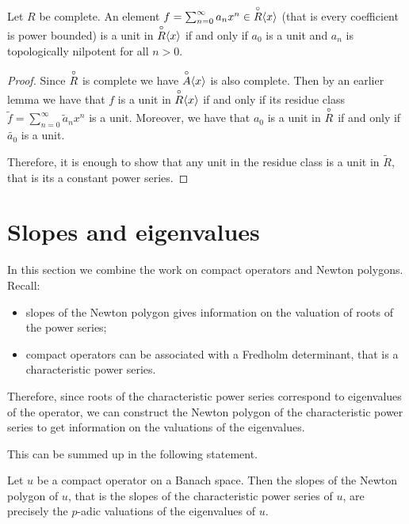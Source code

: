 \begin{lemma}
  Let $R$ be complete. An element $f = \sum_{n = 0}^\infty a_n x^n \in \overset{\circ}{R} \langle x \rangle$ (that
  is every coefficient is power bounded) is a unit in $\overset{\circ}{R} \langle x \rangle$ if and only if $a_0$
  is a unit and $a_n$ is topologically nilpotent for all $n > 0$.
\end{lemma}

\begin{proof}
  Since $\overset{\circ}{R}$ is complete we have $\overset{\circ}{A} \langle x \rangle$ is also complete. Then by an earlier
  lemma we have that $f$ is a unit in $\overset{\circ}{R} \langle x \rangle$ if and only if its residue class
  $ \tilde{f} = \sum_{n=0}^\infty \tilde{a}_n x^n$ is a unit.
  Moreover, we have that $a_0$ is a unit in $\overset{\circ}{R}$ if and only if $\tilde{a_0}$ is a unit.

  Therefore, it is enough to show that any unit in the residue class is a unit in $\tilde{R}$, that
  is its a constant power series.
\end{proof}


\chapter{Slopes and eigenvalues}

In this section we combine the work on compact operators and Newton polygons.
Recall:
\begin{itemize}
  \item slopes of the Newton polygon gives information on the valuation of roots of the
    power series; %
  \item compact operators can be associated with a Fredholm determinant, that is a characteristic
    power series.
\end{itemize}

Therefore, since roots of the characteristic power series %
correspond to eigenvalues of the operator, we can construct the Newton polygon of the characteristic
power series to get information on the valuations of the eigenvalues.

This can be summed up in the following statement.

\begin{lemma}
  Let $u$ be a compact operator on a Banach space. Then the slopes of the Newton polygon of $u$,
  that is the slopes of the characteristic power series of $u$, are precisely the $p$-adic valuations
  of the eigenvalues of $u$.
\end{lemma}


